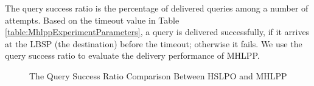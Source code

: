 \noindent The query success ratio is the percentage of delivered queries among a number of attempts. Based on the timeout value in Table \ref{table:MhlppExperimentParameters}, a query is delivered successfully, if it arrives at the LBSP (the destination) before the timeout; otherwise it fails. We use the query success ratio to evaluate the delivery performance of MHLPP.

\begin{figure} [H]
  \centering 
  \hspace{1in} 
  \hspace{1in} 
  \caption{The Query Success Ratio Comparison Between HSLPO and MHLPP} 
  \label{fig:QSR} %
\end{figure}

